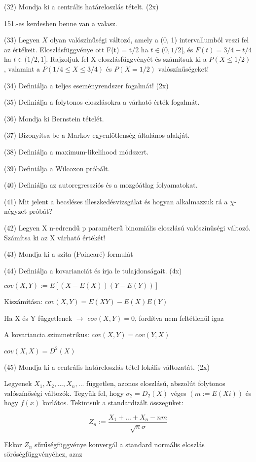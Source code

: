 \documentclass[12p]{article}
\begin{document}
(32) Mondja ki a centrális határeloszlás tételt. (2x)

151.-es kerdesben benne van a valasz.

(33) Legyen $X$ olyan valószínűségi változó, amely a (0, 1) intervallumból veszi fel az értékeit. Eloszlásfüggvénye ott F(t) = t/2 ha $t \in (0, 1/2]$, és $F(t) = 3/4 + t/4$ ha $t \in (1/2, 1]$. Rajzoljuk fel X eloszlásfüggvényét és számítsuk ki a $P(X \leq 1/2)$, valamint a $P(1/4 \leq X \leq 3/4)$ és $P(X = 1/2)$ valószínűségeket!

(34) Definiálja a teljes eseményrendszer fogalmát! (2x)

(35) Definiálja a folytonos eloszlásokra a várható érték fogalmát.

(36) Mondja ki Bernstein tételét.

(37) Bizonyítsa be a Markov egyenlőtlenség általános alakját.

(38) Definiálja a maximum-likelihood módszert.

(39) Definiálja a Wilcoxon próbált.

(40) Definiálja az autoregressziós és a mozgóátlag folyamatokat.

(41) Mit jelent a becsléses illeszkedésvizsgálat és hogyan alkalmazzuk rá a $\chi$-négyzet próbát?

(42) Legyen X n-edrendű p paraméterű binomiális eloszlású valószínűségi változó. Számítsa ki az X várható értékét! 

(43) Mondja ki a szita (Poincaré) formulát

(44) Definiálja a kovarianciát és írja le tulajdonságait. (4x)

$cov(X,Y) := E[(X-E(X))(Y-E(Y))]$

Kiszámítása:
$cov(X,Y) = E(XY)-E(X)E(Y)$

Ha X és Y függetlenek $\rightarrow$ $cov(X,Y) = 0$, fordítva nem feltétlenül igaz

A kovariancia szimmetrikus: $cov(X,Y) = cov(Y,X)$

$cov(X,X) = D^2(X)$

(45) Mondja ki a centrális határeloszlás tétel lokális változatát. (2x)

Legyenek $X_1 , X_2 ,..., X_n ,...$ független, azonos eloszlású, abszolút folytonos valószínőségi változók. Tegyük fel, hogy $\sigma_2=D_2(X)$ véges $(m:=E(Xi))$ és hogy $f(x)$ korlátos. Tekintsük a standardizált összegüket:

$$Z_n := \frac{X_1 + ... + X_n - nm}{\sqrt{n}\sigma}$$

Ekkor $Z_n$ sűrűségfüggvénye konvergál a standard normális
eloszlás sőrőségfüggvényéhez, azaz
\end{document}
